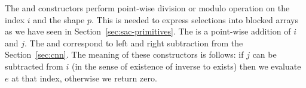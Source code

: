 \begin{code}[hide]
\\
\>[0]\<%
\\
%
\>[2]\AgdaSpace{}%
\AgdaSymbol{:}\AgdaSpace{}%
\AgdaSpace{}%
\AgdaSpace{}%
\AgdaSpace{}%
\AgdaSpace{}%
\AgdaSymbol{(}\AgdaSpace{}%
\AgdaSymbol{)}\AgdaSpace{}%
\AgdaSpace{}%
\AgdaSpace{}%
\AgdaSpace{}%
\AgdaSymbol{(}\AgdaSpace{}%
\AgdaSymbol{)}\<%
\\
%
\>[2]\AgdaSpace{}%
\AgdaSymbol{:}\AgdaSpace{}%
\AgdaSpace{}%
\AgdaSpace{}%
\AgdaSymbol{(}\AgdaSpace{}%
\AgdaSymbol{)}\AgdaSpace{}%
\AgdaSpace{}%
\AgdaSpace{}%
\AgdaSpace{}%
\AgdaSymbol{(}\AgdaSpace{}%
\AgdaSymbol{)}\<%
\\
%
\\[\AgdaEmptyExtraSkip]%
%
\>[2]\AgdaSpace{}%
\AgdaSymbol{:}\AgdaSpace{}%
\AgdaSpace{}%
\AgdaSpace{}%
\AgdaSymbol{(}\AgdaSpace{}%
\AgdaSymbol{)}\AgdaSpace{}%
\AgdaSpace{}%
\AgdaSpace{}%
\AgdaSpace{}%
\AgdaSymbol{(}\AgdaSpace{}%
\AgdaSymbol{)}\<%
\end{code}
The  and  constructors perform point-wise division or modulo
operation on the index $i$ and the shape $p$.  This is needed to express selections
into blocked arrays as we have seen in Section~\ref{sec:sac-primitives}.
The  is a point-wise addition of $i$ and $j$.  The  and
 correspond to left and right subtraction from the Section~\ref{sec:cnn}.
The meaning of these constructors is follows: if $j$ can be subtracted from $i$
(in the sense of existence of inverse to  exists) then we evaluate $e$ at that index,
otherwise we return zero.

